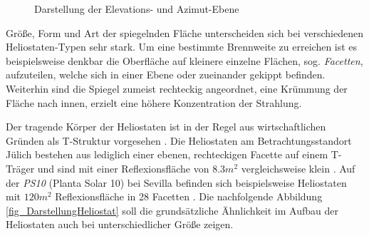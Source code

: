\begin{figure}[h!]
    \centering
    \setlength{\fboxsep}{1pt}
    \setlength{\fboxrule}{1pt}
\caption[Darstellung der Elevations- und Azimut-Ebene]{Darstellung der Elevations- und Azimut-Ebene \cite[S. 6]{DissZanger}}
    \label{fig_FreiheitsgradeHeliostat}
\end{figure}

Größe, Form und Art der spiegelnden Fläche unterscheiden sich bei verschiedenen Heliostaten-Typen sehr stark.
Um eine bestimmte Brennweite zu erreichen ist es beispielsweise denkbar die Oberfläche auf kleinere einzelne Flächen, sog. \textit{Facetten}, aufzuteilen, welche sich in einer Ebene oder zueinander gekippt befinden.
Weiterhin sind die Spiegel zumeist rechteckig angeordnet, eine Krümmung der Fläche nach innen, erzielt eine höhere Konzentration der Strahlung. \cite[S. 5]{DissZanger}

Der tragende Körper der Heliostaten ist in der Regel aus wirtschaftlichen Gründen als T-Struktur vorgesehen \cite[S. 97]{ScottAJones}.
Die Heliostaten am Betrachtungsstandort Jülich bestehen aus lediglich einer ebenen, rechteckigen Facette auf einem T-Träger und sind mit einer Reflexionsfläche von $8.3m^2$ vergleichsweise klein \cite[S. 4]{DissGall}\cite[S. 13]{DissBelhomme}.
Auf der \textit{PS10} (Planta Solar 10) bei Sevilla befinden sich beispielsweise Heliostaten mit $120m^2$ Reflexionsfläche in 28 Facetten \cite[S. 5]{ManuelSilva}.
Die nachfolgende Abbildung \ref{fig_DarstellungHeliostat} soll die grundsätzliche Ähnlichkeit im Aufbau der Heliostaten auch bei unterschiedlicher Größe zeigen.

